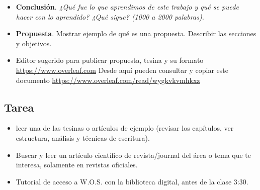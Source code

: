 \documentclass[letterpaper, 10 pt, conference]{ieeeconf}  %
\begin{document}
\begin{itemize}
		\item \textbf{Conclusión}. \emph{¿Qué fue lo que aprendimos de este trabajo y qué se puede hacer con lo aprendido? ¿Qué sigue? (1000 a 2000 palabras).}
		\item \textbf{Propuesta}. Mostrar ejemplo de qué es una propuesta. Describir las secciones y objetivos.
		\item Editor sugerido para publicar propuesta, tesina y su formato \url{https://www.overleaf.com} Desde aquí pueden consultar y copiar este documento \url{https://www.overleaf.com/read/wygkvkvmhkxz}
\end{itemize}

\subsection*{Tarea} 

\begin{itemize}
		\item leer una de las tesinas o artículos de ejemplo (revisar los capítulos, ver estructura, análisis y técnicas de escritura).
		\item Buscar y leer un artículo científico de revista/journal del área o tema que te interesa, solamente en revistas oficiales.
            \item Tutorial de acceso a W.O.S. con la biblioteca digital, antes de la clase 3:30.
\end{itemize}
\end{document}
